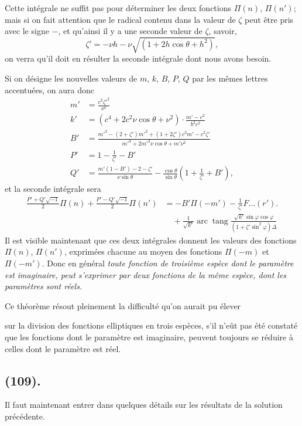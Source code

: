 \documentclass{article}
\begin{document}
Cette intégrale ne suffit pas pour déterminer les deux fonctions $\Pi(n)$, $\Pi(n')$; mais si on fait attention que le radical contenu dans la valeur de $\zeta$ peut être pris avec le signe $-$, et qu'ainsi il y a une seconde valeur de $\zeta$, savoir,
\[ \zeta'=-\nu h-\nu\sqrt{(1+2h\cos\theta+h^{2})}, \]
on verra qu'il doit en résulter la seconde intégrale dont nous avons besoin.

Si on désigne les nouvelles valeurs de $m$, $k$, $B$, $P$, $Q$ par les mêmes lettres accentuées, on aura donc
\[ \begin{aligned} m'&=\frac{c^{2}\zeta'^{2}}{\nu^{2}}\\ k'&=(c^{4}+2c^{2}\nu\cos\theta+\nu^{2})\cdot\frac{m'-c^{2}}{b^{2}c^{2}}\\ B'&=\frac{m'^{3}-(2+\zeta')m'^{2}+(1+2\zeta')c^{2}m'-c^{2}\zeta'}{m'^{3}+2m'^{2}\nu\cos\theta+m'\nu^{2}}\\ P'&=1-\frac{1}{\zeta'}-B'\\ Q'&=\frac{m'(1-B')-2-\zeta'}{\nu\sin\theta}-\frac{\cos\theta}{\sin\theta}\left(1+\frac{1}{\zeta'}+B'\right), \end{aligned} \]
et la seconde intégrale sera
\[ \begin{aligned} \frac{P'+Q'\sqrt{-1}}{2}\Pi(n)+\frac{P'-Q'\sqrt{-1}}{2}\Pi(n')&=-B'\Pi(-m')-\frac{1}{\zeta'}F\ldots(r').\\ &\quad+\frac{1}{\sqrt{k'}}\operatorname{arc}\operatorname{tang}\frac{\sqrt{k'}\sin\varphi\cos\varphi}{(1+\zeta'\sin^{2}\varphi)\Delta} \end{aligned} \]
Il est visible maintenant que ces deux intégrales donnent les valeurs des fonctions $\Pi(n)$, $\Pi(n')$, exprimées chacune au moyen des fonctions $\Pi(-m)$ et $\Pi(-m')$. Donc en général \emph{toute fonction de troisième espèce dont le paramètre est imaginaire, peut s'exprimer par deux fonctions de la même espèce, dont les paramètres sont réels.}

Ce théorème résout pleinement la difficulté qu'on aurait pu élever

sur la division des fonctions elliptiques en trois espèces, s'il n'eût pas été constaté que les fonctions dont le paramètre est imaginaire, peuvent toujours se réduire à celles dont le paramètre est réel.

\subsection*{(109).}

Il faut maintenant entrer dans quelques détails sur les résultats de la solution précédente.
\end{document}
